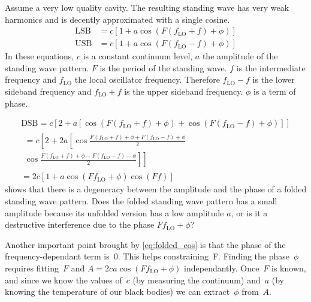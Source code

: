 Assume a very low quality cavity.
The resulting standing wave has very weak harmonics and is decently approximated with a single cosine.
\begin{align}
    \text{LSB} &= c \left[ 1 + a \cos(F(f_\text{LO} + f) + \phi) \right]
    \\
    \text{USB} &= c \left[ 1 + a \cos(F(f_\text{LO} - f) + \phi) \right]
\end{align}
In these equations, $c$ is a constant continuum level, $a$ the amplitude of the standing wave pattern.
$F$ is the period of the standing wave.
$f$ is the intermediate frequency and $f_\text{LO}$ the local oscillator frequency.
Therefore $f_\text{LO} - f$ is the lower sideband frequency and $f_\text{LO} + f$ is the upper sideband frequency.
$\phi$ is a term of phase.

\begin{gather}
    \text{DSB} = c
        \left[
            2 + a 
            \left[
                \cos \left( F(f_\text{LO} + f) + \phi \right)
                +
                \cos \left( F(f_\text{LO} - f) + \phi \right)
            \right]
        \right]
    \\
    \begin{split}
    = c
        \left[
            2 + 2a
            \left[
                \cos \frac{F(f_\text{LO} + f) + \phi + F(f_\text{LO} - f) + \phi}{2}
            \right.
        \right.\\
        \left.
            \left.
                \cos \frac{F(f_\text{LO} + f) + \phi - F(f_\text{LO} - f) - \phi}{2}
            \right]
        \right]
    \end{split}
    \\
    = 2c \left[ 1+a \cos(F f_\text{LO} + \phi) \cos(F f) \right] \label{eq:folded_cos}
\end{gather}
 shows that there is a degeneracy between the amplitude and the phase of a folded standing wave pattern.
Does the folded standing wave pattern has a small amplitude because its unfolded version has a low amplitude $a$, or is it a destructive interference due to the phase $F f_\text{LO} + \phi$?

Another important point brought by \cref{eq:folded_cos} is that the phase of the frequency-dependant term is~0.
This helps constraining~F.
Finding the phase~$\phi$ requires fitting~$F$ and $A=2ca \cos(F f_\text{LO} + \phi)$
independantly.
Once~$F$ is known, and since we know the values of~$c$ (by measuring the continuum) and~$a$ (by knowing the temperature of our black bodies) we can extract~$\phi$ from~$A$.

